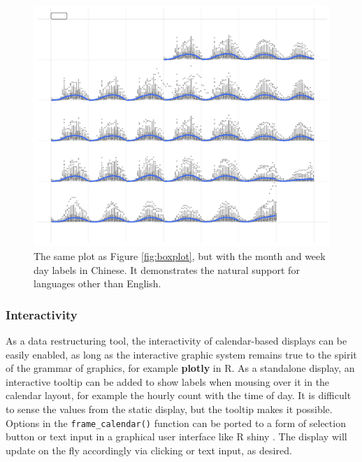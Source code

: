\documentclass[12pt]{article}
\begin{document}
\begin{figure}

{\centering \includegraphics[width=\textwidth]{figure/chn-1} 

}

\caption{The same plot as Figure \ref{fig:boxplot}, but with the month and week day labels in Chinese. It demonstrates the natural support for languages other than English.}\label{fig:chn}
\end{figure}



\hypertarget{interactivity}{%
\subsubsection{Interactivity}\label{interactivity}}

As a data restructuring tool, the interactivity of calendar-based displays can be easily enabled, as long as the interactive graphic system remains true to the spirit of the grammar of graphics, for example \textbf{plotly} \citep{plotly} in R. As a standalone display, an interactive tooltip can be added to show labels when mousing over it in the calendar layout, for example the hourly count with the time of day. It is difficult to sense the values from the static display, but the tooltip makes it possible. Options in the \texttt{frame\_calendar()} function can be ported to a form of selection button or text input in a graphical user interface like R shiny \citep{R-shiny}. The display will update on the fly accordingly via clicking or text input, as desired.
\end{document}
